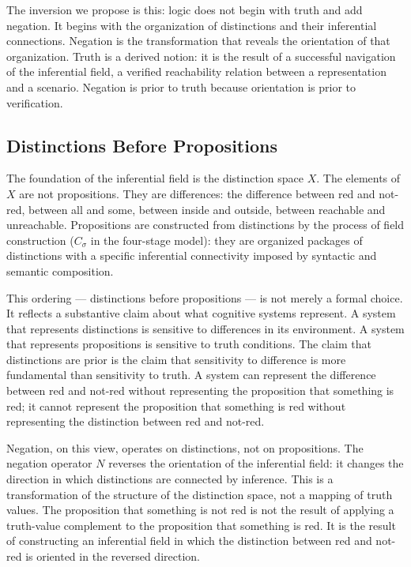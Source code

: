 \documentclass[12pt]{article}
\theoremstyle{remark}
\begin{document}
The inversion we propose is this: logic does not begin with truth and
add negation. It begins with the organization of distinctions and their
inferential connections. Negation is the transformation that reveals the
orientation of that organization. Truth is a derived notion: it is the
result of a successful navigation of the inferential field, a verified
reachability relation between a representation and a scenario. Negation
is prior to truth because orientation is prior to verification.

\subsection{Distinctions Before Propositions}

The foundation of the inferential field is the distinction space $X$.
The elements of $X$ are not propositions. They are differences: the
difference between red and not-red, between all and some, between inside
and outside, between reachable and unreachable. Propositions are
constructed from distinctions by the process of field construction
($C_\sigma$ in the four-stage model): they are organized packages of
distinctions with a specific inferential connectivity imposed by
syntactic and semantic composition.

This ordering --- distinctions before propositions --- is not merely a
formal choice. It reflects a substantive claim about what cognitive
systems represent. A system that represents distinctions is sensitive to
differences in its environment. A system that represents propositions is
sensitive to truth conditions. The claim that distinctions are prior is
the claim that sensitivity to difference is more fundamental than
sensitivity to truth. A system can represent the difference between red
and not-red without representing the proposition that something is red;
it cannot represent the proposition that something is red without
representing the distinction between red and not-red.

Negation, on this view, operates on distinctions, not on propositions.
The negation operator $N$ reverses the orientation of the inferential
field: it changes the direction in which distinctions are connected by
inference. This is a transformation of the structure of the distinction
space, not a mapping of truth values. The proposition that something is
not red is not the result of applying a truth-value complement to the
proposition that something is red. It is the result of constructing an
inferential field in which the distinction between red and not-red is
oriented in the reversed direction.
\end{document}
